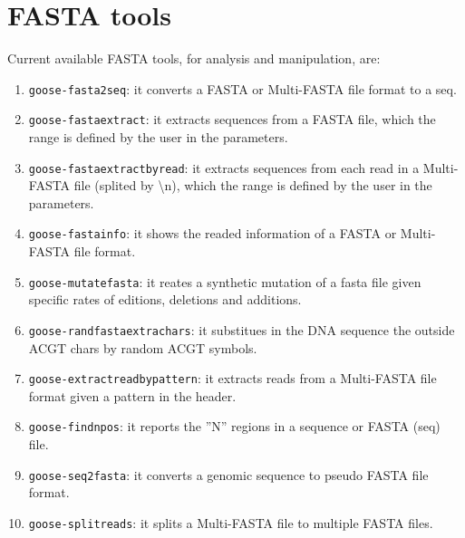 \chapter{FASTA tools}
\label{fasta}

Current available FASTA tools, for analysis and manipulation, are:
\begin{enumerate}
\item \texttt{goose-fasta2seq}: it converts a FASTA or Multi-FASTA file format to a seq.
\item \texttt{goose-fastaextract}: it extracts sequences from a FASTA file, which the range is defined by the user in the parameters.
\item \texttt{goose-fastaextractbyread}: it extracts sequences from each read in a Multi-FASTA file (splited by \textbackslash n), which the range is defined by the user in the parameters.
\item \texttt{goose-fastainfo}: it shows the readed information of a FASTA or Multi-FASTA file format.
\item \texttt{goose-mutatefasta}: it reates a synthetic mutation of a fasta file given specific rates of editions, deletions and additions.
\item \texttt{goose-randfastaextrachars}: it substitues in the DNA sequence the outside ACGT chars by random ACGT symbols.
\item \texttt{goose-extractreadbypattern}: it extracts reads from a Multi-FASTA file format given a pattern in the header.
\item \texttt{goose-findnpos}: it reports the ''N'' regions in a sequence or FASTA (seq) file.
\item \texttt{goose-seq2fasta}: it converts a genomic sequence to pseudo FASTA file format.
\item \texttt{goose-splitreads}: it splits a Multi-FASTA file to multiple FASTA files.

\end{enumerate}




 





%



